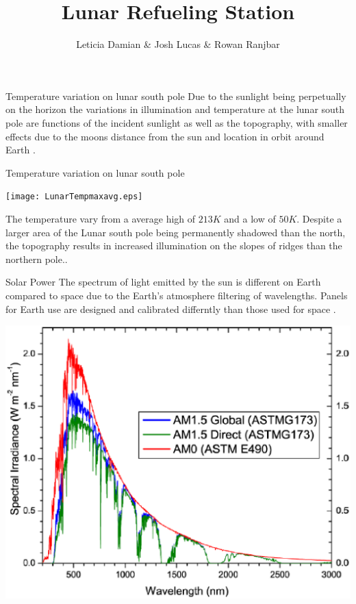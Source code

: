 \documentclass{beamer}
\title{ Lunar Refueling Station}
\author{Leticia Damian \& Josh Lucas \& Rowan Ranjbar }
\institute[CSUSM] %
{
  \inst{1}%
  Dept. of Physics\\
  California State University San Marcos
}
\date %
\begin{document}
 
\frame{\titlepage}


\begin{frame}{Temperature variation on lunar south pole}
Due to the sunlight being perpetually on the horizon the variations in illumination and temperature at the lunar south pole are functions of the incident sunlight as well as the topography, with smaller effects due to the moons distance from the sun and location in orbit around Earth \cite{Williams}.
\end{frame}





\begin{frame}{Temperature variation on lunar south pole}
 \begin{center}
             \texttt{[image: LunarTempmaxavg.eps]}   
      \end{center}  
 The temperature vary from a average high of $213K $ and a low of $50K$.
 Despite a larger area of the Lunar south pole being permanently shadowed than the north, the topography results in increased illumination on the slopes of ridges than the northern pole.\cite{Williams}\cite{Hayne}.
\end{frame}

\begin{frame}{Solar Power}
The spectrum of light emitted by the sun is different on Earth compared to space due to the Earth's atmosphere filtering of  wavelengths. Panels for Earth use are designed and calibrated differntly than those used for space\cite{Liebert} \cite{Mcevoy}.  
 \begin{center}
             \includegraphics[width=.68\textwidth]{AM0.eps}   
      \end{center}  

\end{frame}
\end{document}

